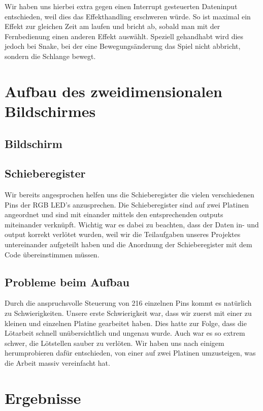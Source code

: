 \documentclass[12pt,a4paper]{article}
\begin{document}
Wir haben uns hierbei extra gegen einen Interrupt gesteuerten Dateninput entschieden, weil dies das Effekthandling erschweren würde. So ist maximal ein Effekt zur gleichen Zeit am laufen und bricht ab, sobald man mit der Fernbedienung einen anderen Effekt auswählt. Speziell gehandhabt wird dies jedoch bei Snake, bei der eine Bewegungsänderung das Spiel nicht abbricht, sondern die Schlange bewegt.
\newpage
\section{Aufbau des zweidimensionalen Bildschirmes}

\subsection{Bildschirm}

\subsection{Schieberegister}

Wir bereits angesprochen helfen uns die Schieberegister die vielen verschiedenen Pins der RGB LED's anzusprechen. Die Schieberegister sind auf zwei Platinen angeordnet und sind mit einander mittels den entsprechenden outputs miteinander verknüpft. Wichtig war es dabei zu beachten, dass der Daten in- und output korrekt verlötet wurden, weil wir die Teilaufgaben unseres Projektes untereinander aufgeteilt haben und die Anordnung der Schieberegister mit dem Code übereinstimmen müssen.

\subsection{Probleme beim Aufbau}

Durch die anspruchsvolle Steuerung von 216 einzelnen Pins kommt es natürlich zu Schwierigkeiten. Unsere erste Schwierigkeit war, dass wir  zuerst mit einer zu kleinen und einzelnen Platine gearbeitet haben. Dies hatte zur Folge, dass die Lötarbeit schnell unübersichtlich und ungenau wurde. Auch war es so extrem schwer, die Lötstellen sauber zu verlöten. Wir haben uns nach einigem herumprobieren dafür entschieden, von einer auf zwei Platinen umzusteigen, was die Arbeit massiv vereinfacht hat.

\newpage
\section{Ergebnisse}
\end{document}
